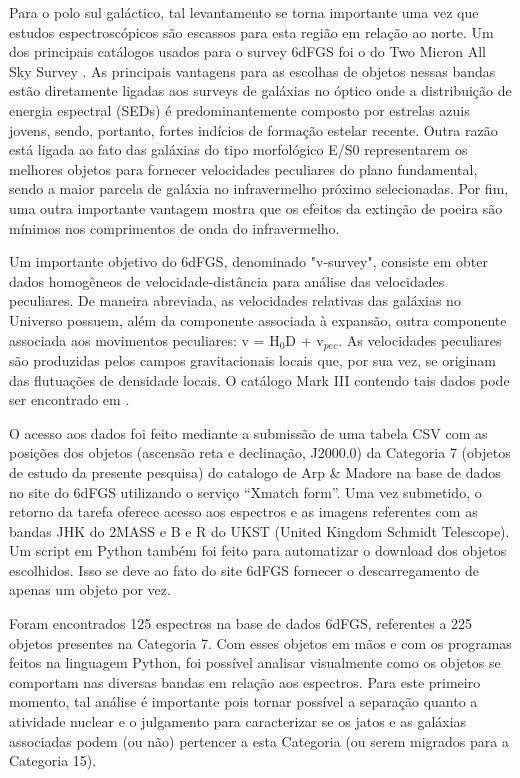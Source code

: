 Para o polo sul galáctico, tal levantamento se torna importante uma vez que estudos espectroscópicos são escassos para esta região em relação ao norte. Um dos principais catálogos usados para o survey 6dFGS foi o do Two Micron All Sky Survey \cite{jarrett20002mass}.  As principais vantagens para as escolhas de objetos nessas bandas estão diretamente ligadas aos surveys de galáxias no óptico onde a distribuição de energia espectral (SEDs) é predominantemente composto por estrelas azuis jovens, sendo, portanto, fortes indícios de formação estelar recente. Outra razão está ligada ao fato das galáxias do tipo morfológico E/S0 representarem os melhores objetos para fornecer velocidades peculiares do plano fundamental, sendo a maior parcela de galáxia no infravermelho próximo selecionadas. Por fim, uma outra importante vantagem mostra que os efeitos da extinção de poeira são mínimos nos comprimentos de onda do infravermelho.

Um importante objetivo do 6dFGS, denominado "v-survey", consiste em obter dados homogêneos de velocidade-distância para análise das velocidades peculiares. De maneira abreviada, as velocidades relativas das galáxias no Universo possuem, além da componente associada à expansão, outra componente associada aos movimentos peculiares: v = H$_{0}$D + v$_{pec}$. As velocidades peculiares são produzidas pelos campos gravitacionais locais que, por sua vez, se originam das flutuações de densidade locais. O catálogo Mark III contendo tais dados pode ser encontrado em \cite{willick1997homogeneous}.

O acesso aos dados foi feito mediante a submissão de uma tabela CSV com as posições dos objetos (ascensão reta e declinação, J2000.0) da Categoria 7 (objetos de estudo da presente pesquisa) do catalogo de Arp \& Madore \cite{arp1987catalogue} na base de dados no site do 6dFGS \cite{jones20096df} utilizando o serviço “Xmatch form”. Uma vez submetido, o retorno da tarefa oferece acesso aos espectros e as imagens referentes com as bandas JHK do 2MASS e B e R do UKST (United Kingdom Schmidt Telescope). Um script em Python também foi feito para automatizar o download dos objetos escolhidos. Isso se deve ao fato do site 6dFGS fornecer o descarregamento de apenas um objeto por vez.

Foram encontrados 125 espectros na base de dados 6dFGS, referentes a 225 objetos presentes na Categoria 7. Com esses objetos em mãos e com os programas feitos na linguagem Python, foi possível analisar visualmente como os objetos se comportam nas diversas bandas em relação aos espectros. Para este primeiro momento, tal análise é importante pois tornar possível a separação quanto a atividade nuclear e o julgamento para caracterizar se os jatos e as galáxias associadas podem (ou não) pertencer a esta Categoria (ou serem migrados para a Categoria 15).

